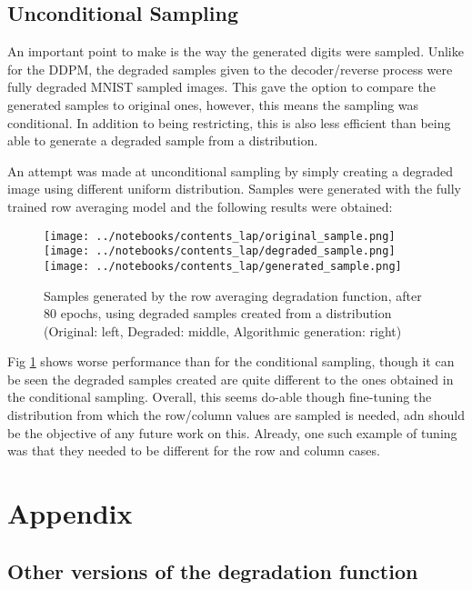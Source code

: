 \documentclass[12pt]{report} %
\begin{document}
\newpage
\section{Unconditional Sampling}

An important point to make is the way the generated digits were sampled. Unlike for the DDPM, the degraded samples given to the decoder/reverse process were fully degraded MNIST sampled images. This gave the option to compare the generated samples to original ones, however, this means the sampling was conditional\cite[Section 5]{bansal2022cold}. In addition to being restricting, this is also less efficient than being able to generate a degraded sample from a distribution.

An attempt was made at unconditional sampling by simply creating a degraded image using different uniform distribution. Samples were generated with the fully trained row averaging model and the following results were obtained:

\begin{figure}[ht]
  \centering
  \texttt{[image: ../notebooks/contents\_lap/original\_sample.png]}
  \texttt{[image: ../notebooks/contents\_lap/degraded\_sample.png]}
  \texttt{[image: ../notebooks/contents\_lap/generated\_sample.png]}
  \captionsetup{font=footnotesize}
  \caption{Samples generated by the row averaging degradation function, after 80 epochs, using degraded samples created from a distribution (Original: left, Degraded: middle, Algorithmic generation: right)}
  \label{fig:row_avg_samples3}
\end{figure}

Fig \ref{fig:row_avg_samples3} shows worse performance than for the conditional sampling, though it can be seen the degraded samples created are quite different to the ones obtained in the conditional sampling. Overall, this seems do-able though fine-tuning the distribution from which the row/column values are sampled is needed, adn should be the objective of any future work on this. Already, one such example of tuning was that they needed to be different for the row and column cases.



\chapter{Appendix}

\section{Other versions of the degradation function}
\end{document}
